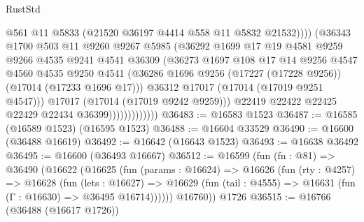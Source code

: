 \begin{lexlean}{RustStd}
\begin{coremodule}
                                  @561
                                  @11
                                  @5833
                                  (@21520 @36197 @4414 @558 @11 @5832 @21532))))
                            (@36343
                              @1700
                              @503
                              @11
                              @9260
                              @9267
                              @5985
                              (@36292
                                @1699
                                @17
                                @19
                                @4581
                                @9259
                                @9266
                                @4535
                                @9241
                                @4541
                                @36309
                                (@36273
                                  @1697
                                  @108
                                  @17
                                  @14
                                  @9256
                                  @4547
                                  @4560
                                  @4535
                                  @9250
                                  @4541
                                  (@36286
                                    @1696
                                    @9256
                                    (@17227 (@17228 @9256))
                                    (@17014 (@17233 @1696 @17)))
                                  @36312
                                  @17017
                                  (@17014 (@17019 @9251 @4547)))
                                @17017
                                (@17014 (@17019 @9242 @9259)))
                              @22419
                              @22422
                              @22425
                              @22429
                              @22434
                              @36399)))))))))))))
@36483 := @16583 @1523
@36487 := @16585 (@16589 @1523) (@16595 @1523)
@36488 := @16604 @33529
@36490 := @16600 (@36488 @16619)
@36492 := @16642 (@16643 @1523)
@36493 := @16638 @36492
@36495 := @16600 (@36493 @16667)
@36512 := @16599
    (fun (fn : @81) =>
    @36490
      (@16622
        (@16625
          (fun (params : @16624) =>
          @16626
            (fun (rty : @4257) =>
            @16628
              (fun (lets : @16627) =>
              @16629 (fun (tail : @4555) => @16631 (fun (Γ : @16630) => @36495 @16714))))))
        @16760))
    @1726
@36515 := @16766 (@36488 (@16617 @1726))

\end{coremodule}
\end{lexlean}
